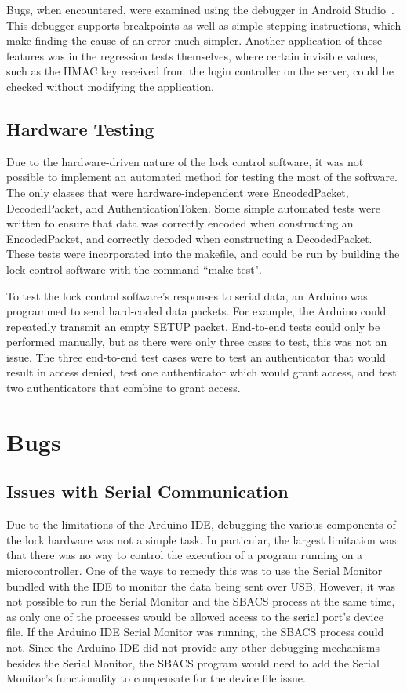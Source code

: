 \documentclass[12pt]{report}
\let\Oldsection\section
\renewcommand{\section}{\FloatBarrier\Oldsection}
\let\Oldsubsection\subsection
\renewcommand{\subsection}{\FloatBarrier\Oldsubsection}
\begin{document}
Bugs, when encountered, were examined using the debugger in Android Studio~\autocite{ANDROIDSTUDIO}. This debugger
supports breakpoints as well as simple stepping instructions, which make finding the cause of an error much simpler.
Another application of these features was in the regression tests themselves, where certain invisible values, such as
the HMAC key received from the login controller on the server, could be checked without modifying the application.

\subsection{Hardware Testing} \label{hardware-testing}

Due to the hardware-driven nature of the lock control software, it was not possible to implement an automated method 
for testing the most of the software. The only classes that were hardware-independent were EncodedPacket, DecodedPacket, and 
AuthenticationToken. Some simple automated tests were written to ensure that data was correctly encoded when 
constructing an EncodedPacket, and correctly decoded when constructing a DecodedPacket. These tests were incorporated 
into the makefile, and could be run by building the lock control software with the command ``make test".

To test the lock control software's responses to serial data, an Arduino was programmed to send hard-coded data packets. 
For example, the Arduino could repeatedly transmit an empty SETUP packet. End-to-end tests could only be performed 
manually, but as there were only three cases to test, this was not an issue. The three end-to-end test cases were to 
test an authenticator that would result in access denied, test one authenticator which would grant access, and test two 
authenticators that combine to grant access.

\section{Bugs} \label{bugs}

\subsection{Issues with Serial Communication} \label{issues-with-serial-communcation}

Due to the limitations of the Arduino IDE, debugging the various components of the lock hardware was not a simple task. 
In particular, the largest limitation was that there was no way to control the execution of a program running on a 
microcontroller. One of the ways to remedy this was to use the Serial Monitor bundled with the IDE to monitor the data 
being sent over USB. However, it was not possible to run the Serial Monitor and the SBACS process at the same time, as 
only one of the processes would be allowed access to the serial port's device file. If the Arduino IDE Serial Monitor 
was running, the SBACS process could not. Since the Arduino IDE did not provide any other debugging mechanisms besides 
the Serial Monitor, the SBACS program would need to add the Serial Monitor's functionality to compensate for the device 
file issue.
\end{document}

